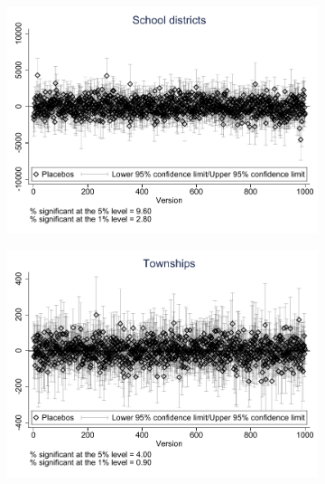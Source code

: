 \documentclass{article}
\begin{document}
\begin{landscape}
\begin{figure}[htbp]
\begin{subfigure}{0.4\textwidth}
        \includegraphics[width=\linewidth]{figures/exogeneity_tests/D17_placebo_schdist_ind_new_ctrls.pdf}
        \label{fig:sub3}
    \end{subfigure}
    \begin{subfigure}{0.4\textwidth}
        \includegraphics[width=\linewidth]{figures/exogeneity_tests/D17_placebo_gen_town_new_ctrls.pdf}
        \label{fig:sub4}
    \end{subfigure}
    \begin{subfigure}{0.4\textwidth}

\end{subfigure}
\end{figure}
\end{landscape}
\end{document}
